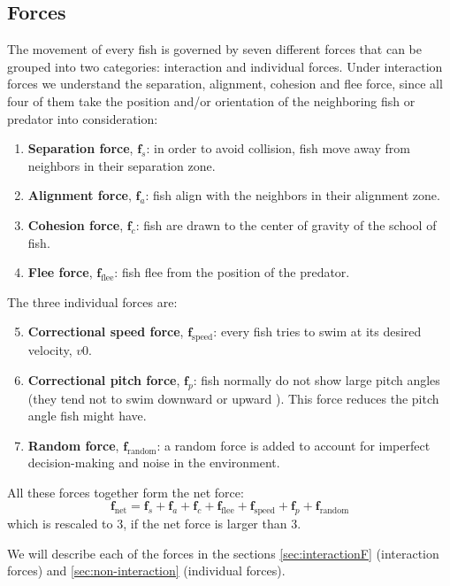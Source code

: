 \documentclass[11pt,a4paper]{article}
\begin{document}
\subsection{Forces}
The movement of every fish is governed by seven different forces that can be grouped into two categories: interaction and individual forces. Under interaction forces we understand the separation, alignment, cohesion and flee force, since all four of them take the position and/or orientation of the neighboring fish or predator into consideration:
\begin{enumerate}
\item \textbf{Separation force}, $\mathbf{f}_{s}$: in order to avoid collision, fish move away from neighbors in their separation zone. 
\item \textbf{Alignment force}, $\mathbf{f}_{a}$: fish align with the neighbors in their alignment zone. 
\item \textbf{Cohesion force}, $\mathbf{f}_{c}$: fish are drawn to the center of gravity of the school of fish. 
\item \textbf{Flee force}, $\mathbf{f}_{\text{flee}}$: fish flee from the position of the predator. 
\end{enumerate}
The three individual forces are:
\begin{enumerate}
\setcounter{enumi}{4}
\item \textbf{Correctional speed force}, $\mathbf{f}_{\text{speed}}$: every fish tries to swim at its desired velocity, $v0$. 
\item \textbf{Correctional pitch force}, $\mathbf{f}_{p}$: fish normally do not show large pitch angles (they tend not to swim downward or upward \cite{hemelrijk}). This force reduces the pitch angle fish might have. 
\item \textbf{Random force}, $\mathbf{f}_\text{random}$: a random force is added to account for imperfect decision-making and noise in the environment. 
\end{enumerate}
All these forces together form the net force:
\begin{equation}
\mathbf{f}_\text{net} = \mathbf{f}_s + \mathbf{f}_a + \mathbf{f}_c + \mathbf{f}_\text{flee} + \mathbf{f}_\text{speed} + \mathbf{f}_p + \mathbf{f}_\text{random}
\label{eq:fnet}
\end{equation}
which is rescaled to $3$, if the net force is larger than $3$.

We will describe each of the forces in the sections \ref{sec:interactionF} (interaction forces) and \ref{sec:non-interaction} (individual forces). 
\end{document}
